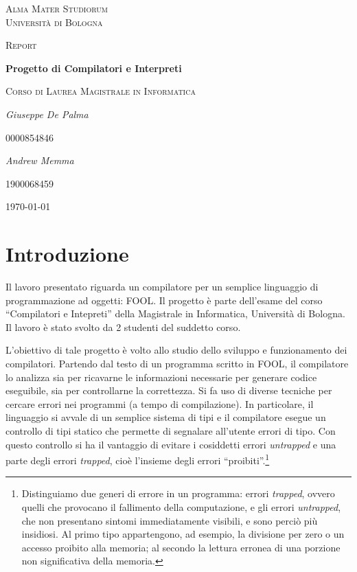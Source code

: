 \documentclass{scrreprt}
\begin{document}
\begin{titlepage}
	\centering
	{\scshape\LARGE Alma Mater Studiorum\\Università di Bologna \par}
	\vspace{1cm}
	{\scshape\Large Report\par}
	\vspace{1.5cm}
    {\huge\bfseries Progetto di Compilatori e Interpreti\par}
    \vspace{0.5cm}
    {\scshape\Large Corso di Laurea Magistrale in Informatica\par}
	\vspace{2cm}
    {\Large\itshape Giuseppe De Palma\par}
    {\Large 0000854846\par}
	\vspace{0.5cm}    
    {\Large\itshape Andrew Memma\par}
    {\Large1900068459\par}
    \vfill
    
	{\large \today\par}
\end{titlepage}

\tableofcontents

\chapter{Introduzione}
Il lavoro presentato riguarda un compilatore per un semplice linguaggio di programmazione ad oggetti: FOOL. Il progetto è parte dell'esame del corso ``Compilatori e Intepreti'' della Magistrale in Informatica, Università di Bologna. Il lavoro è stato svolto da 2 studenti del suddetto corso.

L'obiettivo di tale progetto è volto allo studio dello sviluppo e funzionamento dei compilatori. Partendo dal testo di un programma scritto in FOOL, il compilatore lo analizza sia per ricavarne le informazioni necessarie per generare codice eseguibile, sia per controllarne la correttezza. 
Si fa uso di diverse tecniche per cercare errori nei programmi (a tempo di compilazione). In particolare, il linguaggio si avvale di un semplice sistema di tipi e il compilatore esegue un controllo di tipi statico che permette di segnalare all'utente errori di tipo. Con questo controllo si ha il vantaggio di evitare
i cosiddetti errori \textit{untrapped} e una parte degli errori \textit{trapped}, cioè l'insieme degli errori ``proibiti''.\footnote{Distinguiamo due generi di errore in un programma: errori \textit{trapped}, ovvero quelli che provocano il fallimento della computazione, e gli errori	\textit{untrapped}, che non	presentano sintomi immediatamente visibili, e sono perciò più insidiosi. 
Al primo tipo appartengono, ad esempio, la divisione per zero o un accesso proibito alla memoria; al secondo la lettura erronea di una porzione non significativa della memoria.}
\end{document}
